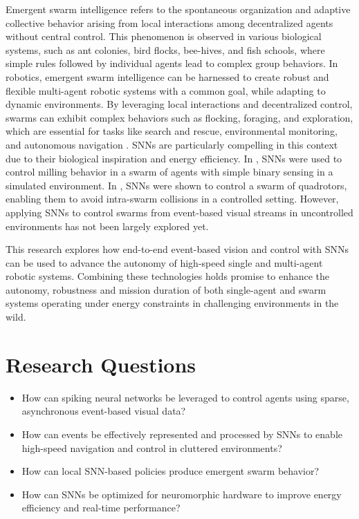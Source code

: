 \documentclass{article}
\begin{document}
Emergent swarm intelligence refers to the spontaneous organization and adaptive collective behavior arising from local interactions among decentralized agents without central control. This phenomenon is observed in various biological systems, such as ant colonies, bird flocks, bee-hives, and fish schools, where simple rules followed by individual agents lead to complex group behaviors. In robotics, emergent swarm intelligence can be harnessed to create robust and flexible multi-agent robotic systems with a common goal, while adapting to dynamic environments. By leveraging local interactions and decentralized control, swarms can exhibit complex behaviors such as flocking, foraging, and exploration, which are essential for tasks like search and rescue, environmental monitoring, and autonomous navigation \cite{debieSwarmRoboticsSurvey2023}. SNNs are particularly compelling in this context due to their biological inspiration and energy efficiency. In \cite{zhuSpikingNeuralNetworks2024}, SNNs were used to control milling behavior in a swarm of agents with simple binary sensing in a simulated environment. In \cite{zhaoNatureinspiredSelforganizingCollision2022}, SNNs were shown to control a swarm of quadrotors, enabling them to avoid intra-swarm collisions in a controlled setting. However, applying SNNs to control swarms from event-based visual streams in uncontrolled environments has not been largely explored yet. 

This research explores how end-to-end event-based vision and control with SNNs can be used to advance the autonomy of high-speed single and multi-agent robotic systems. Combining these technologies holds promise to enhance the autonomy, robustness and mission duration of both single-agent and swarm systems operating under energy constraints in challenging environments in the wild.

\section{Research Questions}
\begin{itemize}
    \item How can spiking neural networks be leveraged to control agents using sparse, asynchronous event-based visual data?
    \item How can events be effectively represented and processed by SNNs to enable high-speed navigation and control in cluttered environments?
    \item How can local SNN-based policies produce emergent swarm behavior?
    \item How can SNNs be optimized for neuromorphic hardware to improve energy efficiency and real-time performance?
\end{itemize}
\end{document}
